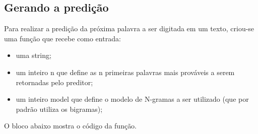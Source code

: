 \documentclass[a4paper,11pt,final]{article}
\begin{document}
\subsection{Gerando a predição}

Para realizar a predição da próxima palavra a ser digitada em um texto, criou-se uma função que recebe como entrada:
\begin{itemize}
    \item uma string;
    \item um inteiro n que define as n primeiras palavras mais prováveis a serem retornadas pelo preditor;
    \item um inteiro model que define o modelo de N-gramas a ser utilizado (que por padrão utiliza os bigramas);
\end{itemize}

O bloco abaixo mostra o código da função.
\end{document}
